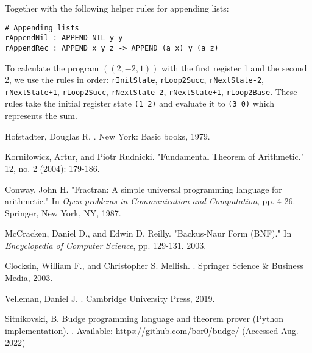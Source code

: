 \documentclass{article}
\begin{document}
Together with the following helper rules for appending lists:

\begin{verbatim}
# Appending lists
rAppendNil : APPEND NIL y y
rAppendRec : APPEND x y z -> APPEND (a x) y (a z)
\end{verbatim}

To calculate the program $((2, -2, 1))$ with the first register 1 and the second 2, we use the rules in order: \texttt{rInitState}, \texttt{rLoop2Succ}, \texttt{rNextState-2}, \texttt{rNextState+1}, \texttt{rLoop2Succ}, \texttt{rNextState-2}, \texttt{rNextState+1}, \texttt{rLoop2Base}. These rules take the initial register state \texttt{(1 2)} and evaluate it to \texttt{(3 0)} which represents the sum.

\begin{thebibliography}{1}

Hofstadter, Douglas R.
.
\newblock New York: Basic books, 1979.

Korniłowicz, Artur, and Piotr Rudnicki.
\newblock "Fundamental Theorem of Arithmetic."
 12, no. 2 (2004): 179-186.

Conway, John H.
\newblock "Fractran: A simple universal programming language for arithmetic."
\newblock In {\em Open problems in Communication and Computation}, pp. 4-26. Springer, New York, NY, 1987.

McCracken, Daniel D., and Edwin D. Reilly.
\newblock "Backus-Naur Form (BNF)."
\newblock In {\em Encyclopedia of Computer Science}, pp. 129-131. 2003.

Clocksin, William F., and Christopher S. Mellish.
.
\newblock Springer Science \& Business Media, 2003.

Velleman, Daniel J.
.
\newblock Cambridge University Press, 2019.

Sitnikovski, B.
\newblock Budge programming language and theorem prover (Python implementation).
\newblock [Online]. Available: \url{https://github.com/bor0/budge/} (Accessed Aug. 2022)

\end{thebibliography}
\end{document}
